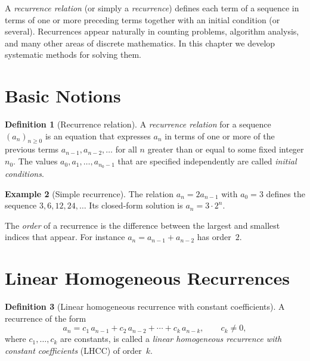 \documentclass[12pt,a4paper,openany]{book}
\theoremstyle{definition}
\newtheorem{definition}{Definition}[chapter]
\newtheorem{example}[definition]{Example}
\theoremstyle{plain}
\theoremstyle{remark}
\begin{document}
A \emph{recurrence relation} (or simply a
\emph{recurrence}) defines each term of a sequence in terms of one or
more preceding terms together with an initial condition (or several).
Recurrences appear naturally in counting problems, algorithm analysis,
and many other areas of discrete mathematics.  In this chapter we develop
systematic methods for solving them.

\section{Basic Notions}\label{sec:rec-basic}

\begin{definition}[Recurrence relation]\label{def:recurrence}
A \emph{recurrence relation} for a sequence $(a_n)_{n\ge 0}$ is an
equation that expresses $a_n$ in terms of one or more of the previous
terms $a_{n-1}, a_{n-2}, \dots$ for all $n$ greater than or equal to
some fixed integer $n_0$.  The values $a_0, a_1, \dots, a_{n_0-1}$ that
are specified independently are called \emph{initial conditions}.
\end{definition}

\begin{example}[Simple recurrence]\label{ex:simple-rec}
The relation $a_n = 2a_{n-1}$ with $a_0 = 3$ defines the sequence
$3, 6, 12, 24, \dots$  Its closed-form solution is $a_n = 3 \cdot 2^n$.
\end{example}

The \emph{order} of a recurrence is the
difference between the largest and smallest indices that appear.  For
instance $a_n = a_{n-1} + a_{n-2}$ has order~$2$.

\section{Linear Homogeneous Recurrences}\label{sec:rec-homogeneous}

\begin{definition}[Linear homogeneous recurrence with constant coefficients]\label{def:LHCC}
A recurrence of the form
\[
   a_n = c_1\, a_{n-1} + c_2\, a_{n-2} + \cdots + c_k\, a_{n-k},
   \qquad c_k \neq 0,
\]
where $c_1, \dots, c_k$ are constants, is called a \emph{linear
homogeneous recurrence with constant coefficients} (LHCC) of order~$k$.
\end{definition}
\end{document}
